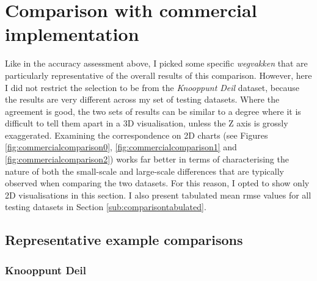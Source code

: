 \section{Comparison with commercial implementation}
\label{sec:r_comparison}

Like in the accuracy assessment above, I picked some specific \textit{wegvakken} that are particularly representative of the overall results of this comparison. However, here I did not restrict the selection to be from the \textit{Knooppunt Deil} dataset, because the results are very different across my set of testing datasets. Where the agreement is good, the two sets of results can be similar to a degree where it is difficult to tell them apart in a 3D visualisation, unless the Z axis is grossly exaggerated. Examining the correspondence on 2D charts (see Figures \ref{fig:commercialcomparison0}, \ref{fig:commercialcomparison1} and \ref{fig:commercialcomparison2}) works far better in terms of characterising the nature of both the small-scale and large-scale differences that are typically observed when comparing the two datasets. For this reason, I opted to show only 2D visualisations in this section. I also present tabulated mean \ac{rmse} values for all testing datasets in Section \ref{sub:comparisontabulated}.

\subsection{Representative example comparisons}
\label{sub:comparisonexamples}

\subsubsection{Knooppunt Deil}

